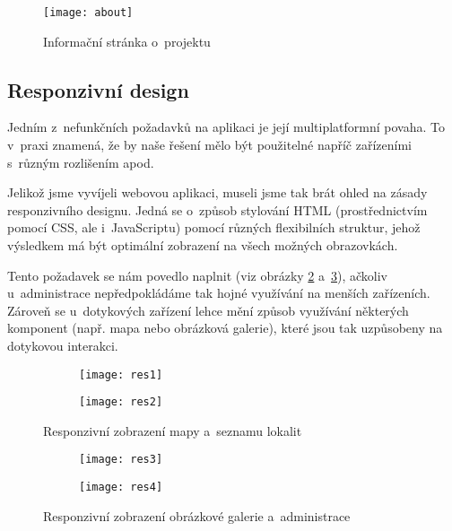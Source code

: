 \begin{figure}
    \centering
    \texttt{[image: about]}  
    \caption{Informační stránka o~projektu}
    \label{about}
\end{figure}

\hypertarget{responzivnuxed-design}{%
\subsection{Responzivní design}\label{responzivnuxed-design}}

Jedním z~nefunkčních požadavků na aplikaci je její multiplatformní povaha. To v~praxi znamená, že by naše řešení mělo být použitelné napříč zařízeními s~různým rozlišením apod.

Jelikož jsme vyvíjeli webovou aplikaci, museli jsme tak brát ohled na zásady responzivního designu. Jedná se o~způsob stylování HTML (prostřednictvím pomocí CSS, ale i~JavaScriptu) pomocí různých flexibilních struktur, jehož výsledkem má být optimální zobrazení na všech možných obrazovkách.

Tento požadavek se nám povedlo naplnit (viz obrázky \ref{resA} a~\ref{resB}), ačkoliv u~administrace nepředpokládáme tak hojné využívání na menších zařízeních. Zároveň se u~dotykových zařízení lehce mění způsob využívání některých komponent (např. mapa nebo obrázková galerie), které jsou tak uzpůsobeny na dotykovou interakci.

\begin{figure}
  \begin{subfigure}[b]{0.425\textwidth}
    \texttt{[image: res1]}
  \end{subfigure}
  \hfill
  \begin{subfigure}[b]{0.425\textwidth}
    \texttt{[image: res2]}
  \end{subfigure}
  \caption{Responzivní zobrazení mapy a~seznamu lokalit}
  \label{resA}
\end{figure}

\begin{figure}
  \begin{subfigure}[b]{0.425\textwidth}
    \texttt{[image: res3]}
  \end{subfigure}
  \hfill
  \begin{subfigure}[b]{0.425\textwidth}
    \texttt{[image: res4]}
  \end{subfigure}
  \caption{Responzivní zobrazení obrázkové galerie a~administrace}
  \label{resB}
\end{figure}
